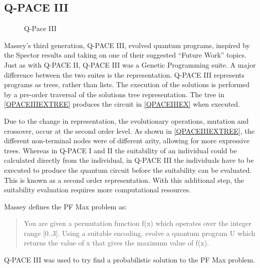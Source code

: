 \subsection{Q-PACE III}

\begin{figure}
\begin{center}

\hspace{20pt}            
\end{center}
\caption{Q-Pace III}
\end{figure}

Massey's third generation, Q-PACE III, evolved quantum programs, inspired by the Spector\cite{LSpectorGPforQC,LSpectorANDOR,Spector:1999:QCA:316573.317112} results and taking on one of their suggested ``Future Work'' topics.
Just as with Q-PACE II, Q-PACE III was a Genetic Programming suite.
A major difference between the two suites is the representation.
Q-PACE III represents programs as trees, rather than lists.
The execution of the solutions is performed by a pre-order traversal of the solutions tree representation.
The tree in \ref{QPACEIIIEXTREE} produces the circuit in \ref{QPACEIIIEX} when executed.

Due to the change in representation, the evolutionary operations, mutation and crossover, occur at the second order level.
As shown in \ref{QPACEIIIEXTREE}, the different non-terminal nodes were of different arity, allowing for more expressive trees.
Whereas in Q-PACE I and II the suitability of an individual could be calculated directly from the individual, in Q-PACE III the individuals have to be executed to produce the quantum circuit before the suitability can be evaluated.
This is known as a second order representation.
With this additional step, the suitability evaluation requires more computational resources.

Massey defines the PF Max problem as:
\begin{quote}
 You are given a permutation function f(x) which operates over the integer range [0..3].
Using a suitable encoding, evolve a quantum program U which returns the value of x that gives the maximum value of f(x).\cite{masseythesis}
\end{quote}
Q-PACE III was used to try find a probabilistic solution to the PF Max problem.

